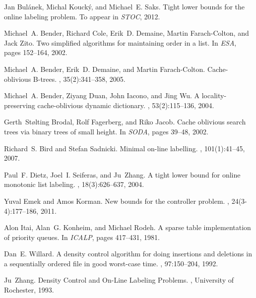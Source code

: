 \documentclass[runningheads,a4paper]{llncs}
\begin{document}
\newcommand{\etalchar}[1]{$^{#1}$}
\begin{thebibliography}{4}

Jan Bul\'anek, Michal Kouck\'y, and  Michael~E. Saks.
\newblock Tight lower bounds for the online labeling problem.
\newblock To appear in {\em STOC}, 2012.


\bibitem[BCD{\etalchar{+}}02]{Benderetal}
Michael~A. Bender, Richard Cole, Erik~D. Demaine, Martin Farach-Colton, and
  Jack Zito.
\newblock Two simplified algorithms for maintaining order in a list.
\newblock In {\em ESA}, pages 152--164, 2002.

Michael~A. Bender, Erik~D. Demaine, and Martin Farach-Colton.
\newblock Cache-oblivious {B}-trees.
, 35(2):341--358, 2005.

Michael~A. Bender, Ziyang Duan, John Iacono, and Jing Wu.
\newblock A locality-preserving cache-oblivious dynamic dictionary.
, 53(2):115--136, 2004.

Gerth~St{\o}lting Brodal, Rolf Fagerberg, and Riko Jacob.
\newblock Cache oblivious search trees via binary trees of small height.
\newblock In {\em SODA}, pages 39--48, 2002.

Richard~S. Bird and Stefan Sadnicki.
\newblock Minimal on-line labelling.
, 101(1):41--45, 2007.


Paul~F. Dietz, Joel~I. Seiferas, and Ju~Zhang.
\newblock A tight lower bound for online monotonic list labeling.
, 18(3):626--637, 2004.


Yuval Emek and Amos Korman.
\newblock New bounds for the controller problem.
, 24(3-4):177--186, 2011.

Alon Itai, Alan~G. Konheim, and Michael Rodeh.
\newblock A sparse table implementation of priority queues.
\newblock In {\em ICALP}, pages 417--431, 1981.

Dan~E. Willard.
\newblock A density control algorithm for doing insertions and deletions in a
  sequentially ordered file in good worst-case time.
, 97:150--204, 1992.

Ju~Zhang.
\newblock Density Control and On-Line Labeling Problems.
, University of Rochester, 1993.
\end{thebibliography}
\end{document}
